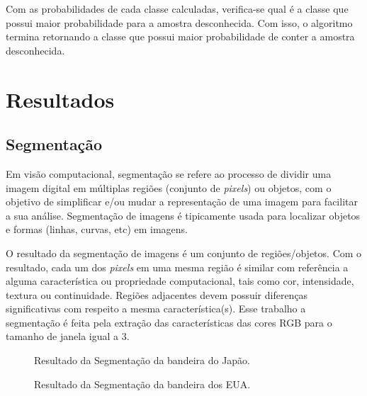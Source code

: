 \documentclass[preprint,12pt]{elsarticle}
\begin{document}
Com as probabilidades de cada classe calculadas, verifica-se qual é a classe que possui maior probabilidade para a amostra desconhecida. Com isso, o algoritmo termina retornando a classe que possui maior probabilidade de conter a amostra desconhecida.


\section{Resultados}

\subsection{Segmentação}

Em visão computacional, segmentação se refere ao processo de dividir uma imagem digital em múltiplas regiões (conjunto de \textit{pixels}) ou objetos, com o objetivo de simplificar e/ou mudar a representação de uma imagem para facilitar a sua análise. Segmentação de imagens é tipicamente usada para localizar objetos e formas (linhas, curvas, etc) em imagens.

O resultado da segmentação de imagens é um conjunto de regiões/objetos. Com o resultado, cada um dos \textit{pixels} em uma mesma região é similar com referência a alguma característica ou propriedade computacional, tais como cor, intensidade, textura ou continuidade. Regiões adjacentes devem possuir diferenças significativas com respeito a mesma característica(s). Esse trabalho a segmentação é feita pela extração das características das cores RGB para o tamanho de janela igual a 3.


\begin{figure}[H]
	\centering
	
	
	\caption{Resultado da Segmentação da bandeira do Japão.}
	\label{fig:flagJapan}
\end{figure}

\begin{figure}[H]
	\centering
	
	
	\caption{Resultado da Segmentação da bandeira dos EUA.}
	\label{fig:flagEUA}
\end{figure}
\end{document}
